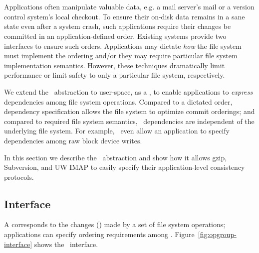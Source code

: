 \section{\Opgroups}
\label{sec:opgroup}

\newcommand{\pgCreate}{\texttt{pg\_create()}}
\newcommand{\pgDepend}{\texttt{pg\_depend()}}
\newcommand{\pgEngage}{\texttt{pg\_engage()}}
\newcommand{\pgDisengage}{\texttt{pg\_disengage()}}
\newcommand{\pgRelease}{\texttt{pg\_release()}}
\newcommand{\pgSync}{\texttt{pg\_sync()}}
\newcommand{\pgClose}{\texttt{pg\_close()}}

Applications often manipulate valuable data, e.g. a mail server's mail
or a version control system's local checkout.
%
To ensure their on-disk data remains in a sane state even after a
system crash, such applications require their changes be committed in
an application-defined order.
%
Existing systems provide two interfaces to ensure such orders.
%
Applications may dictate \emph{how} the file system must implement the
ordering and/or they may require particular file system implementation
semantics.
%
However, these techniques dramatically limit performance or limit
safety to only a particular file system, respectively.

We extend the \chdesc\ abstraction to user-space, as a \opgroup,
%
to enable applications to \emph{express} dependencies among file system
operations.
%
Compared to a dictated order, dependency specification allows the file
system to optimize commit orderings;
%
and compared to required file system semantics, \opgroup\ dependencies
are independent of the underlying file system.
%
For example, \opgroups\ even allow an application to specify
dependencies among raw block device writes.

In this section we describe the \opgroup\ abstraction
%
and show how it allows gzip, Subversion, and UW IMAP to easily specify
their application-level consistency protocols.

\subsection{Interface}
\label{sec:opgroup:interface}

A \emph{\opgroup} corresponds to the changes (\chdescs) made by a set of
file system operations;
%
applications can specify ordering requirements among \opgroups.
%
Figure~\ref{fig:opgroup-interface} shows the \opgroup\ interface.

